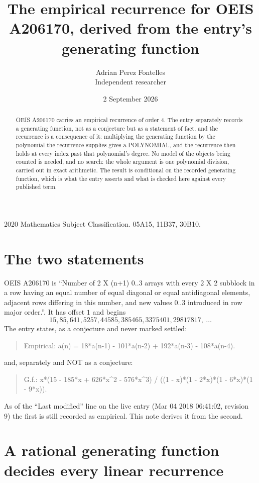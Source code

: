\documentclass[11pt,a4paper]{article}
\title{The empirical recurrence for OEIS A206170, derived from the entry's generating function}
\author{Adrian Perez Fontelles\\ \small Independent researcher}
\date{2 September 2026}
\theoremstyle{plain}
\theoremstyle{definition}
\begin{document}
\maketitle

\begin{abstract}
OEIS A206170 carries an empirical recurrence of order $4$. The entry separately records a
generating function, not as a conjecture but as a statement of fact, and the recurrence is a
consequence of it: multiplying the generating function by the polynomial the recurrence
supplies gives a POLYNOMIAL, and the recurrence then holds at every index past that
polynomial's degree. No model of the objects being counted is needed, and no search: the
whole argument is one polynomial division, carried out in exact arithmetic. The result is
conditional on the recorded generating function, which is what the entry asserts and what is
checked here against every published term.
\end{abstract}

\noindent\small 2020 Mathematics Subject Classification. 05A15, 11B37, 30B10.\normalsize

\section{The two statements}

OEIS A206170 is ``Number of 2 X (n+1) 0..3 arrays with every 2 X 2 subblock in a row having an equal number of equal diagonal or equal antidiagonal elements, adjacent rows differing in this number, and new values 0..3 introduced in row major order.''. It has offset $1$ and begins
\[
15, 85, 641, 5257, 44585, 385465, 3375401, 29817817,\ \dots
\]
The entry states, as a conjecture and never marked settled:
\begin{quote}
Empirical: a(n) = 18*a(n-1) - 101*a(n-2) + 192*a(n-3) - 108*a(n-4).
\end{quote}
and, separately and NOT as a conjecture:
\begin{quote}
G.f.: x*(15 - 185*x + 626*x\^{}2 - 576*x\^{}3) / ((1 - x)*(1 - 2*x)*(1 - 6*x)*(1 - 9*x)).
\end{quote}
As of the ``Last modified'' line on the live entry (Mar 04 2018 06:41:02, revision 9) the first is still
recorded as empirical. This note derives it from the second.

\section{A rational generating function decides every linear recurrence}
\end{document}
